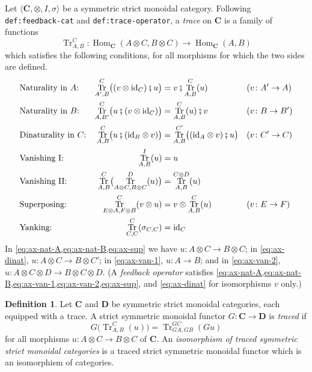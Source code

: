 \documentclass[11pt,a4paper]{article}
\theoremstyle{plain}
\theoremstyle{definition}
\newtheorem{definition}[theorem]{Definition}
\theoremstyle{remark}
\newcommand{\Cat}[1]{\mathbf{#1}}
\newcommand{\then}{\mathbin{\fatsemi}}
\newcommand{\tup}[1]{\langle #1 \rangle}
\DeclareMathOperator{\Tr}{Tr}
\newcommand{\id}{\mathrm{id}}
\newcommand{\lbl}[1]{\nolinkurl{#1}}
\begin{document}
Let $\tup{\Cat{C}, \otimes, I, \sigma}$ be a symmetric strict monoidal category.
Following \lbl{def:feedback-cat} and \lbl{def:trace-operator}, a \emph{trace} on $\Cat{C}$ is a family of functions
\begin{equation*}
    \Tr^{C}_{A,B} \colon \operatorname{Hom}_{\Cat{C}}(A \otimes C, B \otimes C) \to \operatorname{Hom}_{\Cat{C}}(A, B)
\end{equation*}
which satisfies the following conditions, for all morphisms for which the two sides are defined.
\begin{align}
    \label{eq:ax-nat-A}
    & \text{Naturality in $A$:} &
    \Tr^{C}_{A',B}\bigl((v \otimes \id_C) \then u\bigr) & = v \then \Tr^{C}_{A,B}(u)
    && (v \colon A' \to A) \\
    \label{eq:ax-nat-B}
    & \text{Naturality in $B$:} &
    \Tr^{C}_{A,B'}\bigl(u \then (v \otimes \id_C)\bigr) & = \Tr^{C}_{A,B}(u) \then v
    && (v \colon B \to B') \\
    \label{eq:ax-dinat}
    & \text{Dinaturality in $C$:} &
    \Tr^{C}_{A,B}\bigl(u \then (\id_B \otimes v)\bigr) & = \Tr^{C'}_{A,B}\bigl((\id_A \otimes v) \then u\bigr)
    && (v \colon C' \to C) \\
    \label{eq:ax-van-1}
    & \text{Vanishing I:} &
    \Tr^{I}_{A,B}(u) & = u \\
    \label{eq:ax-van-2}
    & \text{Vanishing II:} &
    \Tr^{C}_{A,B}\bigl(\Tr^{D}_{A \otimes C, B \otimes C}(u)\bigr) & = \Tr^{C \otimes D}_{A,B}(u) \\
    \label{eq:ax-sup}
    & \text{Superposing:} &
    \Tr^{C}_{E \otimes A, F \otimes B}(v \otimes u) & = v \otimes \Tr^{C}_{A,B}(u)
    && (v \colon E \to F) \\
    \label{eq:ax-yank}
    & \text{Yanking:} &
    \Tr^{C}_{C,C}(\sigma_{C,C}) & = \id_C
\end{align}
In \cref{eq:ax-nat-A,eq:ax-nat-B,eq:ax-sup} we have $u \colon A \otimes C \to B \otimes C$; in \cref{eq:ax-dinat}, $u \colon A \otimes C \to B \otimes C'$; in \cref{eq:ax-van-1}, $u \colon A \to B$; and in \cref{eq:ax-van-2}, $u \colon A \otimes C \otimes D \to B \otimes C \otimes D$.
(A \emph{feedback operator} satisfies \cref{eq:ax-nat-A,eq:ax-nat-B,eq:ax-van-1,eq:ax-van-2,eq:ax-sup}, and \cref{eq:ax-dinat} for isomorphisms $v$ only.)

\begin{definition}
    \label{def:traced-functor}
    Let $\Cat{C}$ and $\Cat{D}$ be symmetric strict monoidal categories, each equipped with a trace.
    A strict symmetric monoidal functor $G \colon \Cat{C} \to \Cat{D}$ is \emph{traced} if
    \begin{equation}
        \label{eq:traced-functor}
        G\bigl(\Tr^{C}_{A,B}(u)\bigr) = \Tr^{GC}_{GA,GB}(Gu)
    \end{equation}
    for all morphisms $u \colon A \otimes C \to B \otimes C$ of $\Cat{C}$.
    An \emph{isomorphism of traced symmetric strict monoidal categories} is a traced strict symmetric monoidal functor which is an isomorphism of categories.
\end{definition}
\end{document}
